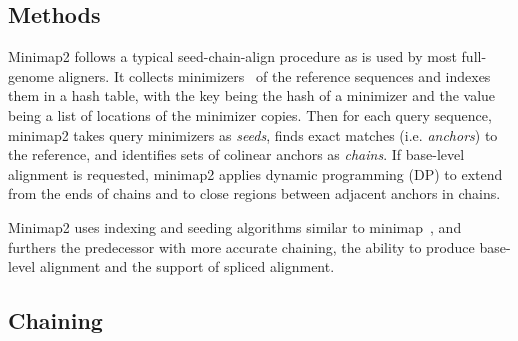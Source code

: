 \documentclass{bioinfo}
\begin{document}
\begin{methods}
\section{Methods}

Minimap2 follows a typical seed-chain-align procedure as is used by most
full-genome aligners. It collects minimizers~\citep{Roberts:2004fv} of the
reference sequences and indexes them in a hash table, with the key being the
hash of a minimizer and the value being a list of locations of the minimizer
copies. Then for each query
sequence, minimap2 takes query minimizers as \emph{seeds}, finds exact matches
(i.e. \emph{anchors}) to the reference, and identifies sets of colinear anchors as
\emph{chains}. If base-level alignment is requested, minimap2 applies dynamic
programming (DP) to extend from the ends of chains and to close
regions between adjacent anchors in chains.

Minimap2 uses indexing and seeding algorithms similar to
minimap~\citep{Li:2016aa}, and furthers the predecessor with more accurate
chaining, the ability to produce base-level alignment and the support of
spliced alignment.

\subsection{Chaining}


\end{methods}
\end{document}
